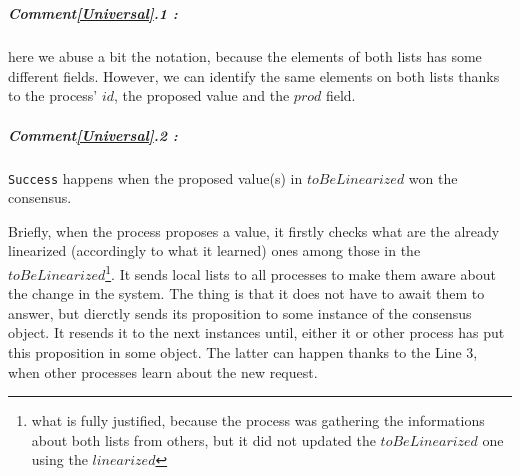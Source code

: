\documentclass{article}
\theoremstyle{remark}
\begin{document}
\\
\subparagraph{Comment\ref{Universal}.1 :} here we abuse a bit the notation, because the elements of both lists has some different fields. However, we can identify the same elements on both lists thanks to the process' $id$, the proposed value and the $prod$ field.\\
\subparagraph{Comment\ref{Universal}.2 :} \texttt{Success} happens when the proposed value(s) in $toBeLinearized$ won the consensus.

Briefly, when the process proposes a value, it firstly checks what are the already linearized (accordingly to what it learned) ones among those in the $toBeLinearized$\footnote{what is fully justified, because the process was gathering the informations about both lists from others, but it did not updated the $toBeLinearized$ one using the $linearized$}. It sends local lists to all processes to make them aware about the change in the system. The thing is that it does not have to await them to answer, but dierctly sends its proposition to some instance of the consensus object. It resends it to the next instances until, either it or other process has put this proposition in some object. The latter can happen thanks to the Line 3, when other processes learn about the new request.
%
%
\end{document}
